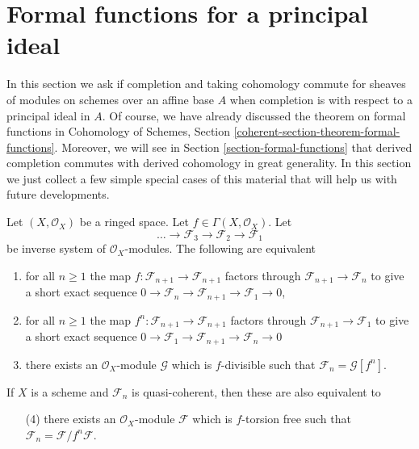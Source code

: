 \section{Formal functions for a principal ideal}
\label{section-formal-functions-principal}

\noindent
In this section we ask if completion and taking cohomology commute
for sheaves of modules on schemes over an affine base $A$ when completion
is with respect to a principal ideal in $A$. Of course, we have already
discussed the theorem on formal functions in
Cohomology of Schemes, Section \ref{coherent-section-theorem-formal-functions}.
Moreover, we will see in Section \ref{section-formal-functions}
that derived completion commutes with derived cohomology in great generality.
In this section we just collect a few simple special cases of this material
that will help us with future developments.

\begin{lemma}
\label{lemma-equivalent-f-good}
Let $(X, \mathcal{O}_X)$ be a ringed space.
Let $f \in \Gamma(X, \mathcal{O}_X)$. Let
$$
\ldots \to \mathcal{F}_3 \to \mathcal{F}_2 \to \mathcal{F}_1
$$
be inverse system of $\mathcal{O}_X$-modules.
The following are equivalent
\begin{enumerate}
\item for all $n \geq 1$ the map
$f : \mathcal{F}_{n + 1} \to \mathcal{F}_{n + 1}$ factors
through $\mathcal{F}_{n + 1} \to \mathcal{F}_n$ to give a
short exact sequence
$0 \to \mathcal{F}_n \to \mathcal{F}_{n + 1} \to \mathcal{F}_1 \to 0$,
\item for all $n \geq 1$ the map
$f^n : \mathcal{F}_{n + 1} \to \mathcal{F}_{n + 1}$
factors through $\mathcal{F}_{n + 1} \to \mathcal{F}_1$
to give a short exact sequence
$0 \to \mathcal{F}_1 \to \mathcal{F}_{n + 1} \to \mathcal{F}_n \to 0$
\item there exists an $\mathcal{O}_X$-module $\mathcal{G}$
which is $f$-divisible such that $\mathcal{F}_n = \mathcal{G}[f^n]$.
\end{enumerate}
If $X$ is a scheme and $\mathcal{F}_n$ is quasi-coherent, then these
are also equivalent to
\begin{enumerate}
\item[(4)] there exists an $\mathcal{O}_X$-module $\mathcal{F}$
which is $f$-torsion free such that
$\mathcal{F}_n = \mathcal{F}/f^n\mathcal{F}$.
\end{enumerate}
\end{lemma}

